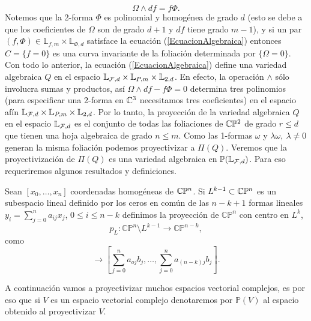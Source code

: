 \begin{equation}
\label{EcuacionAlgebraica} 
\Omega\wedge df=f\Phi.
\end{equation}
\noindent Notemos que la 2-forma $\Phi$ es polinomial y homogénea de grado $d$ (esto se debe a que los coeficientes de $\Omega$ son de grado $d+1$ y $df$ tiene grado $m-1$), y si un par $(f,\Phi)\in\mathbb{L}_{f,m}\times\mathbb{L}_{\Phi,d}$ satisface la ecuación (\ref{EcuacionAlgebraica}) entonces $C=\{f=0\}$ es una curva invariante de la foliación determinada por $\{\Omega=0\}$.\\

Con todo lo anterior, la ecuación (\ref{EcuacionAlgebraica}) define una variedad algebraica $Q$ en el espacio $\mathbb{L}_{\mathcal{F},d}\times\mathbb{L}_{P,m}\times\mathbb{L}_{2,d}$. En efecto, la operación $\wedge$ sólo involucra sumas y productos, así $\Omega\wedge df-f\Phi=0$ determina tres polinomios (para especificar una 2-forma en $\mathbb{C}^{3}$ necesitamos tres coeficientes) en el espacio afín $\mathbb{L}_{\mathcal{F},d}\times\mathbb{L}_{P,m}\times\mathbb{L}_{2,d}$. Por lo tanto, la proyección de la variedad algebraica $Q$ en el espacio $\mathbb{L}_{\mathcal{F},d}$ es el conjunto de todas las foliaciones de $\mathbb{C}\mathbb{P}^2$ de grado $r\leq d$ que tienen una hoja algebraica de grado $n\leq m$. Como las 1-formas $\omega$ y $\lambda\omega,\ \lambda\neq 0$ generan la misma foliación podemos proyectivizar a $\Pi(Q)$. Veremos que la proyectivización de $\Pi(Q)$ es una variedad algebraica en $\mathbb{P}(\mathbb{L}_{\mathcal{F},d})$. Para eso requeriremos algunos resultados y definiciones. \\


\begin{defn}
\label{Def:ProyeccionProyectiva}
Sean $[x_{0},\ldots,x_{n}]$ coordenadas homogéneas de $\mathbb{C}\mathbb{P}^{n}$. Si $L^{k-1}\subset\mathbb{C}\mathbb{P}^{n}$ es un subespacio lineal definido por los ceros en común de las $n-k+1$ formas lineales $y_{i}=\sum_{j=0}^{n} a_{ij}x_{j}$, $0\leq i\leq n-k$ definimos la proyección de $\mathbb{CP}^{n}$ con centro en $L^{k}$,
\begin{equation*}
p_{L}\colon \mathbb{CP}^{n}\setminus L^{k-1}\rightarrow\mathbb{CP}^{n-k},
\end{equation*}
como
\begin{equation*}
[b_{0},\ldots,b_{n}]\rightarrow[\sum_{j=0}^{n} a_{oj}b_{j},\ldots,\sum_{j=0}^{n} a_{(n-k)j}b_{j}].
\end{equation*}
\end{defn}

A continuación vamos a proyectivizar muchos espacios vectorial complejos, es por eso que si $V$ es un espacio vectorial complejo denotaremos por $\mathbb{P}(V)$ al espacio obtenido al proyectivizar $V$.

